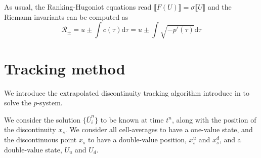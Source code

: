 \documentclass[10pt]{article}
\begin{document}
As usual, the Ranking-Hugoniot equations read $\llbracket F(U) \rrbracket = \sigma \llbracket U \rrbracket$
and the Riemann invariants can be computed as 
$$ \mathcal{R}_\pm = u \pm \int c(\tau) \text{d}\tau = u \pm \int \sqrt{-p'(\tau)}\text{d}\tau $$

\section{Tracking method}

We introduce the extrapolated discontinuity tracking algorithm introduce in \cite{} 
to solve the $p$-system.  

We consider the solution $\{\bar U^n_i\}$ to be known at time $t^n$, along with the position of the 
discontinuity $x_s$. We consider all cell-averages to have a one-value state, and the discontinuous point $x_s$
to have a double-value position, $x_s^u$ and $x_s^d$, and a double-value state, $U_u$ and $U_d$.  
\end{document}
